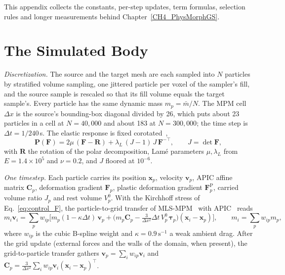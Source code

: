 This appendix collects the constants, per-step updates, term formulas, selection rules and longer measurements behind
Chapter~\ref{CH4_PhysMorphGS}.

\section{The Simulated Body}
\label{app:ch4_body}

\textit{Discretization.} The source and the target mesh are each sampled into $N$ particles by stratified volume sampling,
one jittered particle per voxel of the sampler's fill, and the source sample is rescaled so that its fill volume equals
the target sample's. Every particle has the same dynamic mass $m_p=\bar m/N$. The MPM cell $\Delta x$ is the source's
bounding-box diagonal divided by 26, which puts about 23 particles in a cell at $N=40{,}000$ and about 183 at
$N=300{,}000$; the time step is $\Delta t=1/240$\,s. The elastic response is fixed
corotated~\citep{stomakhin2012energetically,2013-mpm},
\begin{equation}
\label{eq:fc_stress}
\mathbf{P}(\mathbf{F})=2\mu\,(\mathbf{F}-\mathbf{R})+\lambda_{L}\,(J-1)\,J\,\mathbf{F}^{-\top},
\qquad J=\det\mathbf{F},
\end{equation}
with $\mathbf{R}$ the rotation of the polar decomposition, Lam\'e parameters $\mu,\lambda_L$ from $E=1.4\times10^{5}$ and
$\nu=0.2$, and $J$ floored at $10^{-6}$.

\textit{One timestep.} Each particle carries its position $\mathbf{x}_p$, velocity $\mathbf{v}_p$, APIC affine matrix
$\mathbf{C}_p$, deformation gradient $\mathbf{F}_p$, plastic deformation gradient $\mathbf{F}^{\mathrm{P}}_p$, carried volume
ratio $J_p$ and rest volume $V^0_p$. With the Kirchhoff stress of Eq.~\eqref{eq:control_F}, the particle-to-grid transfer
of MLS-MPM~\citep{2018-MLSMPM} with APIC~\citep{jiang2016material} reads
\begin{equation}
\label{ch4:eq_p2g}
m_i\mathbf{v}_i=\sum_p w_{ip}\Big[m_p(1-\kappa\Delta t)\,\mathbf{v}_p
  +\Big(m_p\mathbf{C}_p-\tfrac{3}{\Delta x^{2}}\Delta t\,V^0_p\,\boldsymbol{\tau}_p\Big)(\mathbf{x}_i-\mathbf{x}_p)\Big],
\qquad m_i=\sum_p w_{ip}m_p ,
\end{equation}
where $w_{ip}$ is the cubic B-spline weight and $\kappa=0.9\,\mathrm{s}^{-1}$ a weak ambient drag. After the grid update
(external forces and the walls of the domain, when present), the grid-to-particle transfer gathers
$\mathbf{v}_p=\sum_i w_{ip}\mathbf{v}_i$ and $\mathbf{C}_p=\tfrac{3}{\Delta x^2}\sum_i w_{ip}\mathbf{v}_i(\mathbf{x}_i-\mathbf{x}_p)^{\top}$.

